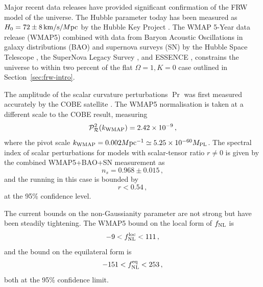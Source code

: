 Major recent data releases have provided significant confirmation of the FRW
model of the universe. The Hubble parameter today has been measured as $H_0 =
72\pm8\,\mathrm{km}/\mathrm{s}/M \mathrm{pc}$ by the Hubble Key Project
\cite{Freedman2001}. The WMAP 5-Year data release (WMAP5) combined with
data from Baryon
Acoustic Oscillations in galaxy distributions (BAO) \cite{Percival2007}
and supernova surveys (SN) by the Hubble Space Telescope \cite{Riess2004,
Riess2007}, the SuperNova Legacy Survey \cite{Astier2006}, and ESSENCE
\cite{Wood-Vasey2007},  constrains the
universe to within two percent of the flat $\Omega =1, K=0$ case outlined in
Section~\ref{sec:frw-intro}. 

The amplitude of the scalar curvature perturbations $\Pr$ was first measured
accurately by the COBE satellite \cite{Bennett1994, Bennett1996c}. The WMAP5
normalisation is taken at a different scale to the COBE result, measuring
% 
\begin{equation}
 \label{eq:wmapnorm-intro}
 \mathcal{P}_{\mathcal{R}}^2 (k_\mathrm{WMAP}) = 2.42 \times 10^{-9}\,,
\end{equation}
% 
where the pivot scale $k_\mathrm{WMAP} = 0.002M \mathrm{pc}^{-1} \simeq 5.25\times 10^{-60}M_{\mathrm{PL}}$. The
spectral index of scalar perturbations for models with scalar-tensor ratio
$r\ne0$ is given by the combined WMAP5+BAO+SN measurement as
% 
\begin{equation}
 \label{eq:wmapns-intro}
 n_s = 0.968 \pm 0.015\,,
\end{equation}
% 
and the running in this case is bounded by
% 
\begin{equation}
\label{eq:rbound-intro}
 r < 0.54\,,
\end{equation}
at the 95\% confidence level.

The current bounds on the non-Gaussianity parameter are not strong but have
been steadily tightening. The WMAP5 bound on the local form of $f_{\mathrm{NL}}$ is
% 
\begin{equation}
 -9<f_{\mathrm{NL}}^\mathrm{loc}<111\,,
\end{equation}
% 
and the bound on the equilateral form is
% 
\begin{equation}
 -151<f_{\mathrm{NL}}^{\mathrm{eq}}<253\,,
\end{equation}
% 
both at the 95\% confidence limit. 



